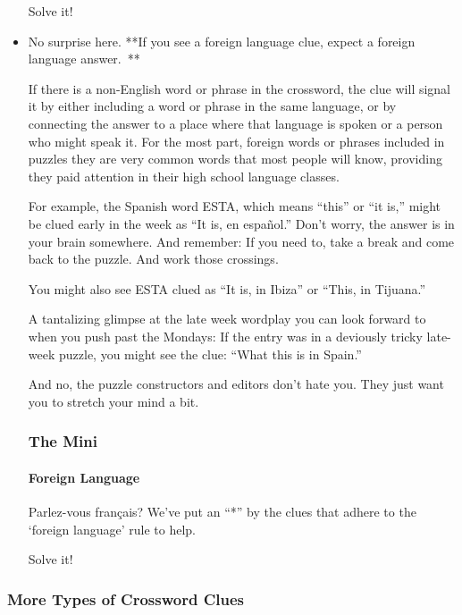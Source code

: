 \begin{itemize}
  Solve it!
\item
  No surprise here. **If you see a foreign language clue, expect a
  foreign language answer.~**

  If there is a non-English word or phrase in the crossword, the clue
  will signal it by either including a word or phrase in the same
  language, or by connecting the answer to a place where that language
  is spoken or a person who might speak it. For the most part, foreign
  words or phrases included in puzzles they are very common words that
  most people will know, providing they paid attention in their high
  school language classes.

  For example, the Spanish word ESTA, which means ``this'' or ``it is,''
  might be clued early in the week as ``It is, en español.'' Don't
  worry, the answer is in your brain somewhere. And remember: If you
  need to, take a break and come back to the puzzle. And work those
  crossings.

  You might also see ESTA clued as ``It is, in Ibiza'' or ``This, in
  Tijuana.''

  A tantalizing glimpse at the late week wordplay you can look forward
  to when you push past the Mondays: If the entry was in a deviously
  tricky late-week puzzle, you might see the clue: ``What this is in
  Spain.''~

  And no, the puzzle constructors and editors don't hate you. They just
  want you to stretch your mind a bit.

  \hypertarget{the-mini-5}{%
  \subsubsection{The Mini}\label{the-mini-5}}

  \href{https://www.nytimes.com/crosswords/game/special/foreign-words}{}

  \hypertarget{foreign-language}{%
  \paragraph{Foreign Language}\label{foreign-language}}

  Parlez-vous français? We've put an ``*'' by the clues that adhere to
  the `foreign language' rule to help.

  Solve it!
\end{itemize}

\hypertarget{more-types-of-crossword-clues}{%
\subsubsection{More Types of Crossword
Clues}\label{more-types-of-crossword-clues}}

